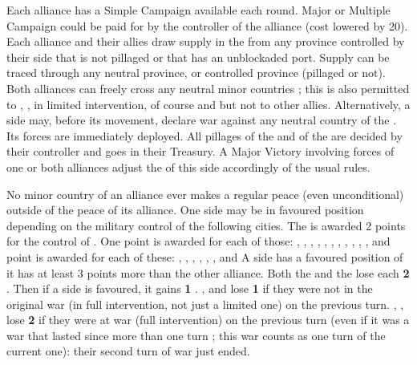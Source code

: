 \begin{digressions}
  \phmil
  \aparag Each alliance has a Simple Campaign available each round.  Major or
  Multiple Campaign could be paid for by the controller of the alliance (cost
  lowered by 20\ducats).
  \aparag Each alliance and their allies draw supply in the \HRE from any
  province controlled by their side that is not pillaged or that has an
  unblockaded port.
  \aparag Supply can be traced through any neutral province, or controlled
  province (pillaged or not).
  \aparag Both alliances can freely cross any neutral \HRE minor countries ;
  this is also permitted to \DANdan, \SUE, \ENG in limited intervention, \HAB
  of course and \SPA but not to other allies.
  \aparag Alternatively, a side may, before its movement, declare war against
  any neutral country of the \HRE. Its forces are immediately deployed.
  \aparag All pillages of the \ligue and of the \alliance are decided by their
  controller and goes in their Treasury.
  \aparag A Major Victory involving forces of one or both alliances adjust the
  \STAB of this side accordingly of the usual rules.



  \phpaix
  \aparag No minor country of an alliance ever makes a regular peace (even
  unconditional) outside of the peace of its alliance.
  \aparag One side may be in favoured position depending on the military
  control of the following cities.
  \bparag The \alliance is awarded 2 points for the control of \villeVienne.
  \bparag One point is awarded for each of those: \villeSpeyer, \villePrague,
  \villeMunich, \villeFreiburg, \villeStrasbourg, \villeHannover, \villeKleve,
  \villeCassel, \villeMagdeburg, \villeBerlin, \villeDresden, \villeFrankfurt
  and \villeBrunswick
  \bparag \textonehalf point is awarded for each of these: \villeKoln,
  \villeStuttgart, \villeUlm, \villeMainz, \villeTrier, \villeHamburg,
  \villeMunster and \villeErfurt
  \bparag A side has a favoured position of it has at least 3 points more than
  the other alliance.
  \aparag Both the \alliance and the \ligue lose each {\bf 2} \STAB.
  \aparag Then if a side is favoured, it gains {\bf 1} \STAB.
  \aparag \SPA, \HOL and \AUS lose {\bf 1} \STAB if they were not in the
  original war (in full intervention, not just a limited one) on the previous
  turn.
  \aparag \SPA, \HOL, \AUS lose {\bf 2} \STAB if they were at war (full
  intervention) on the previous turn (even if it was a war that lasted since
  more than one turn ; this war counts as one turn of the current one): their
  second turn of war just ended.
\end{digressions}
